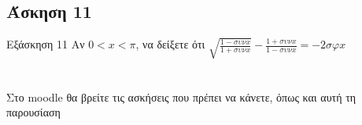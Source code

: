 \documentclass[greek]{beamer}
\begin{document}
\subsection{Άσκηση 11}
\begin{frame}[label=Άσκηση11]{Εξάσκηση 11}
 Αν $0<x<π$, να δείξετε ότι $\sqrt{\frac{1-συνx}{1+συνx}}-\frac{1+συνx}{1-συνx}=-2σφx$

\end{frame}

\section{}
\begin{frame}
 Στο moodle θα βρείτε τις ασκήσεις που πρέπει να κάνετε, όπως και αυτή τη παρουσίαση
\end{frame}

\end{document}

